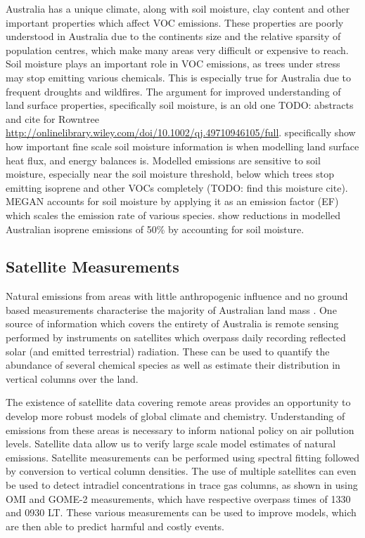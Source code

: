     Australia has a unique climate, along with soil moisture, clay content and other important properties which affect VOC emissions.
    These properties are poorly understood in Australia due to the continents size and the relative sparsity of population centres, which make many areas very difficult or expensive to reach.
    Soil moisture plays an important role in VOC emissions, as trees under stress may stop emitting various chemicals. 
    This is especially true for Australia due to frequent droughts and wildfires.
    The argument for improved understanding of land surface properties, specifically soil moisture, is an old one \citep{Mintz1982, Chen2001} TODO: abstracts and cite for Rowntree \url{http://onlinelibrary.wiley.com/doi/10.1002/qj.49710946105/full}.
    \cite{Chen2001} specifically show how important fine scale soil moisture information is when modelling land surface heat flux, and energy balances is.
    Modelled emissions are sensitive to soil moisture, especially near the soil moisture threshold, below which trees stop emitting isoprene and other VOCs completely (TODO: find this moisture cite).
    MEGAN accounts for soil moisture by applying it as an emission factor (EF) which scales the emission rate of various species.
    \citet{Sindelarova2014} show reductions in modelled Australian isoprene emissions of 50\% by accounting for soil moisture. 
         
  \subsection{Satellite Measurements}

    Natural emissions from areas with little anthropogenic influence and no ground based measurements characterise the majority of Australian land mass \citep{VanDerA2008}.
    One source of information which covers the entirety of Australia is remote sensing performed by instruments on satellites which overpass daily recording reflected solar (and emitted terrestrial) radiation.
    These can be used to quantify the abundance of several chemical species as well as estimate their distribution in vertical columns over the land.

    The existence of satellite data covering remote areas provides an opportunity to develop more robust models of global climate and chemistry.
    Understanding of emissions from these areas is necessary to inform national policy on air pollution levels.
    Satellite data allow us to verify large scale model estimates of natural emissions.
    Satellite measurements can be performed using spectral fitting followed by conversion to vertical column densities.
    The use of multiple satellites can even be used to detect intradiel concentrations in trace gas columns, as shown in \cite{Stavrakou2015} using OMI and GOME-2 measurements, which have respective overpass times of 1330 and 0930 LT.
    These various measurements can be used to improve models, which are then able to predict harmful and costly events.
    
